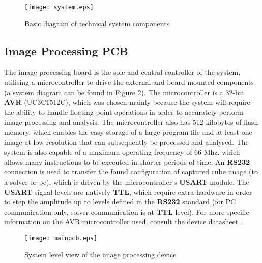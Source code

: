 \documentclass[11pt, a4paper, oneside]{Thesis} %
\begin{document}
\begin{figure}[h]
  \begin{center}
    \texttt{[image: system.eps]}
  \end{center}
  \caption{Basic diagram of technical system components}
  \label{fig:system}
\end{figure}

\subsection{Image Processing PCB}\label{sec:image_pcb}
The image processing board is the sole and central controller of the system, utilising a microcontroller to drive the external and board mounted components (a system diagram can be found in Figure \ref{fig:mainpcb}). The microcontroller is a 32-bit \textbf{AVR} (UC3C1512C), which was chosen mainly because the system will require the ability to handle floating point operations in order to accurately perform image processing and analysis. The microcontroller also has 512 kilobytes of flash memory, which enables the easy storage of a large program file and at least one image at low resolution that can subsequently be processed and analysed. The system is also capable of a maximum operating frequency of 66 Mhz. which allows many instructions to be executed in shorter periods of time. An \textbf{RS232} connection is used to transfer the found configuration of captured cube image (to a solver or pc), which is driven by the microcontroller's \textbf{USART} module. The \textbf{USART} signal levels are natively \textbf{TTL}, which require extra hardware in order to step the amplitude up to levels defined in the \textbf{RS232} standard (for PC communication only, solver communication is at \textbf{TTL} level). For more specific information on the AVR microcontroller used, consult the device datasheet \cite{at32uc3c}. 

\begin{figure}[h]
  \begin{center}
    \texttt{[image: mainpcb.eps]}
  \end{center}
  \caption{System level view of the image processing device}
  \label{fig:mainpcb}
\end{figure}
\end{document}
